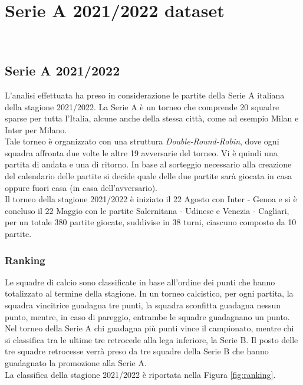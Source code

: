 
\chapter{Serie A 2021/2022 dataset }
\label{cap:dataset}

\\

\section{Serie A 2021/2022}

L'analisi effettuata ha preso in considerazione le partite della Serie A italiana della stagione 2021/2022. La Serie A è un torneo che comprende 20 squadre sparse per tutta l'Italia, alcune anche della stessa città, come ad esempio Milan e Inter per Milano. \\
Tale torneo è organizzato con una struttura \emph{Double-Round-Robin}, dove ogni squadra affronta due volte le altre 19 avversarie del torneo. Vi è quindi una partita di andata e una di ritorno. In base al sorteggio necessario alla creazione del calendario delle partite si decide quale delle due partite sarà giocata in casa oppure fuori casa (in casa dell'avversario). \\
Il torneo della stagione 2021/2022 è iniziato il 22 Agosto con Inter - Genoa e si è concluso il 22 Maggio con le partite Salernitana - Udinese e Venezia - Cagliari, per un totale 380 partite giocate, suddivise in 38 turni, ciascuno composto da 10 partite.

\subsection{Ranking}
Le squadre di calcio sono classificate in base all'ordine dei punti che hanno totalizzato al termine della stagione. In un torneo calcistico, per ogni partita, la squadra vincitrice guadagna tre punti, la squadra sconfitta guadagna nessun punto, mentre, in caso di pareggio, entrambe le squadre guadagnano un punto. Nel torneo della Serie A chi guadagna più punti vince il campionato, mentre chi si classifica tra le ultime tre retrocede alla lega inferiore, la Serie B. Il posto delle tre squadre retrocesse verrà preso da tre squadre della Serie B che hanno guadagnato la promozione alla Serie A.\\ 
La classifica della stagione 2021/2022 è riportata nella Figura \ref{fig:ranking}.

